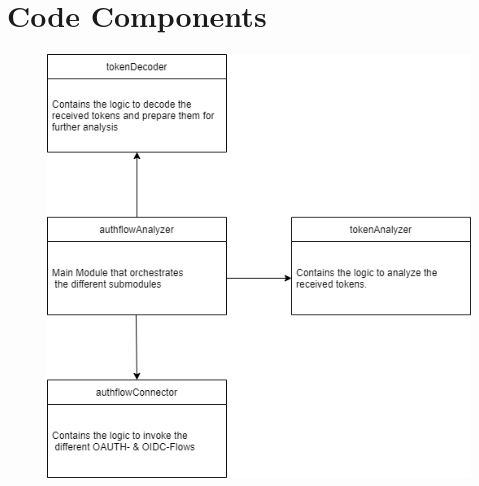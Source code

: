 \documentclass[12pt, a4paper]{article}
\begin{document}
\newpage
\section{Code Components}
\begin{figure}[!h]
    \centering
    \includegraphics[width=\textwidth]{Code-Components}
\end{figure}

\newpage
\end{document}
